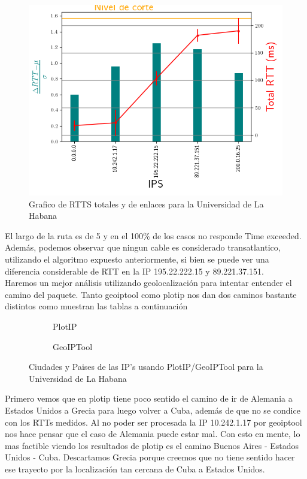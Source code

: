 \begin{figure}[ht]
	\begin{center}
		\includegraphics[width=0.8\columnwidth]{imagenes/rtts_habana.png}
		\caption{Grafico de RTTS totales y de enlaces para la Universidad de La Habana}
	\end{center}
\end{figure}

El largo de la ruta es de 5 y en el 100\% de los casos no responde Time exceeded. Adem\'as, podemos observar que ningun cable es considerado transatlantico, utilizando el algoritmo expuesto anteriormente, si bien se puede ver una diferencia considerable de RTT en la IP 195.22.222.15 y 89.221.37.151.  \\

Haremos un mejor an\'alisis utilizando geolocalizaci\'on para intentar entender el camino del paquete. Tanto geoiptool como plotip nos dan dos caminos bastante distintos como muestran las tablas a continuaci\'on
 
\begin{figure}[ht]
	\begin{subfigure}[b]{0.5\textwidth}
		\centering
		
		\caption{PlotIP}
	\end{subfigure}
	\begin{subfigure}[b]{0.5\textwidth}
		\centering
		
		\caption{GeoIPTool}
	\end{subfigure}
	\caption{Ciudades y Paises de las IP's usando PlotIP/GeoIPTool para la Universidad de La Habana}
\end{figure}


Primero vemos que en plotip tiene poco sentido el camino de ir de Alemania a Estados Unidos a Grecia para luego volver a Cuba, adem\'as de que no se condice con los RTTs medidos. Al no poder ser procesada la IP 10.242.1.17 por geoiptool nos hace pensar que el caso de Alemania puede estar mal. Con esto en mente, lo mas factible viendo los resultados de plotip es el camino Buenos Aires - Estados Unidos - Cuba. Descartamos Grecia porque creemos que no tiene sentido hacer ese trayecto por la localizaci\'on tan cercana de Cuba a Estados Unidos.\\

